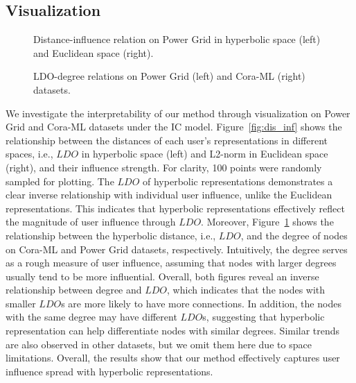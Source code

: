 \subsection{Visualization}
\begin{figure}[!ht]
\centering
    \caption{Distance-influence relation on Power Grid in hyperbolic space (left) and Euclidean space (right).}
    \label{fig:dis_inf}
    \caption{LDO-degree relations on Power Grid (left) and Cora-ML (right) datasets.}
    \label{fig:ldo_degree}
\end{figure}
We investigate the interpretability of our method through visualization on Power Grid and Cora-ML datasets under the IC model. Figure~\ref{fig:dis_inf} shows the relationship between the distances of each user's representations in different spaces, i.e., $LDO$ in hyperbolic space (left) and L2-norm in Euclidean space (right), and their influence strength. For clarity, 100 points were randomly sampled for plotting. The $LDO$ of hyperbolic representations demonstrates a clear inverse relationship with individual user influence, unlike the Euclidean representations. This indicates that hyperbolic representations effectively reflect the magnitude of user influence through $LDO$. 
Moreover, Figure~\ref{fig:ldo_degree} shows the relationship between the hyperbolic distance, i.e., $LDO$, and the degree of nodes on Cora-ML and Power Grid datasets, respectively. 
Intuitively, the degree serves as a rough measure of user influence, assuming that nodes with larger degrees usually tend to be more influential. 
Overall, both figures reveal an inverse relationship between degree and $LDO$, which indicates that the nodes with smaller $LDO$s are more likely to have more connections. In addition, the nodes with the same degree may have different $LDO$s, suggesting that hyperbolic representation can help differentiate nodes with similar degrees. 
Similar trends are also observed in other datasets, but we omit them here due to space limitations.
Overall, the results show that our method effectively captures user influence spread with hyperbolic representations.